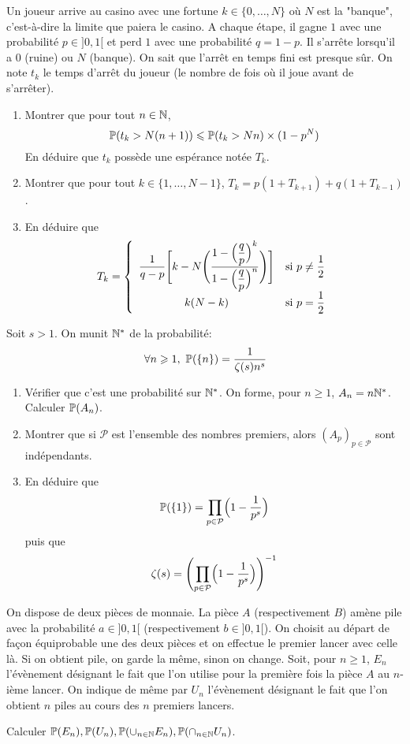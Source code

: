 \begin{exercise}
	Un joueur arrive au casino avec une fortune $k\in\{0,\dots,N\}$ où $N$ est la
	"banque", c'est-à-dire la limite que paiera le casino. A chaque étape, il
	gagne $1$ avec une probabilité $p\in]0,1[$ et perd $1$ avec une probabilité
	$q=1-p$. Il s'arrête lorsqu'il a 0 (ruine) ou $N$ (banque). On sait que
	l'arrêt en temps fini est presque sûr. On note $t_{k}$ le temps d'arrêt du
	joueur (le nombre de fois où il joue avant de s'arrêter).
	\begin{enumerate}
		\item
		Montrer que pour tout $n\in\N$,
		$$\P(t_{k}>N(n+1))\leqslant\P(t_{k}>Nn)\times(1-p^{N})$$ En déduire que
		$t_{k}$ possède une espérance notée $T_{k}$.
		\item
		Montrer que pour tout $k\in\{1,\dots,N-1\}$,
		$T_{k}=p(1+T_{k+1})+q(1+T_{k-1})$.
		\item
		En déduire que 
		$$T_{k}= \left\{
			\begin{array}[]{cc}
				\dfrac{1}{q-p}\Biggl[k-N\Biggl(\dfrac{1-\Bigl(\dfrac{q}{p}\Bigr)^{k}}{1-\Bigl(\dfrac{q}{p}\Bigr)^{n}}\Biggr)\Biggr]
& \text{si }p\neq\dfrac{1}{2}\\
				k(N-k) & \text{si }p=\dfrac{1}{2}
			\end{array}
		\right.$$
	\end{enumerate}
\end{exercise}

\begin{exercise}
	Soit $s>1$. On munit $\N^{*}$ de la probabilité:
	$$\forall n\geqslant1,~\P(\{n\})=\frac{1}{\zeta(s)n^{s}}$$
	\begin{enumerate}
		\item
		Vérifier que c'est une probabilité sur $\N^{*}$. On forme, pour
		$n\geqslant 1$, $A_{n}=n\N^{*}$. Calculer $\P(A_{n})$.
		\item
		Montrer que si $\mathcal{P}$ est l'ensemble des nombres premiers, alors
		$(A_{p})_{p\in\mathcal{P}}$ sont indépendants.
		\item
		En déduire que 
		$$\P(\{1\})=\prod_{p\in\mathcal{P}}\Bigl(1-\frac{1}{p^{s}}\Bigr)$$ puis
		que 
		$$\zeta(s)=\Biggl(\prod_{p\in\mathcal{P}}\Bigl(1-\frac{1}{p^{s}}\Bigr)\Biggr)^{-1}$$
	\end{enumerate}
\end{exercise}

\begin{exercise}
	On dispose de deux pièces de monnaie. La pièce $A$ (respectivement $B$) amène
	pile avec la probabilité $a\in]0,1[$ (respectivement $b\in]0,1[$). On choisit
	au départ de façon équiprobable une des deux pièces et on effectue le premier
	lancer avec celle là. Si on obtient pile, on garde la même, sinon on change.
	Soit, pour $n\geqslant1$, $E_{n}$ l'évènement désignant le fait que l'on
	utilise pour la première fois la pièce $A$ au $n$-ième lancer. On indique de
	même par $U_{n}$ l'évènement désignant le fait que l'on obtient $n$ piles au
	cours des $n$ premiers lancers.

	Calculer $\P(E_{n}),\P(U_{n}),\P(\cup_{n\in\N}E_{n}),\P(\cap_{n\in\N}U_{n})$.
\end{exercise}


